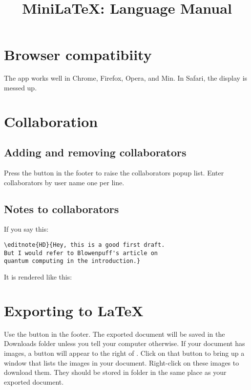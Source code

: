 
\title{MiniLaTeX: Language Manual}

\maketitle

\tableofcontents


\section{Browser compatibiity}

The app works well in Chrome, Firefox, Opera, and Min.   In Safari, the display is messed up.

\section{Collaboration}

\subsection{Adding and removing collaborators}

Press the  button in the footer to raise the collaborators popup list.  Enter collaborators by user name one per line.


\subsection{Notes to collaborators}

If you say this:

\begin{verbatim}
\editnote{HD}{Hey, this is a good first draft.
But I would refer to Blowenpuff's article on
quantum computing in the introduction.}
\end{verbatim}

It is rendered like this:


\section{Exporting to LaTeX}

Use the  button in the footer.  The exported document will be saved in the Downloads folder unless you tell your computer otherwise.  If your document has images, a button  will appear to the right of .  Click on that button to bring up a window that lists the images in your document.  Right-click on these images to download them.  They should be stored in folder  in the same place as your exported document.


